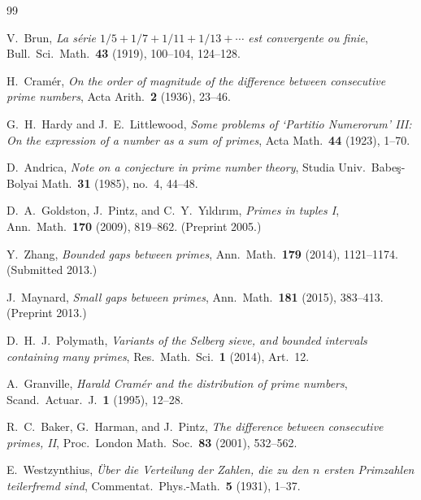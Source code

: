 \documentclass[12pt,a4paper]{amsart}
\theoremstyle{definition}
\begin{document}
\begin{thebibliography}{99}

V.\ Brun,
\textit{La s\'{e}rie $1/5 + 1/7 + 1/11 + 1/13 + \cdots$ est convergente ou finie},
Bull.\ Sci.\ Math.\ \textbf{43} (1919), 100--104, 124--128.

H.\ Cram\'{e}r,
\textit{On the order of magnitude of the difference between consecutive prime
numbers},
Acta Arith.\ \textbf{2} (1936), 23--46.

G.\ H.\ Hardy and J.\ E.\ Littlewood,
\textit{Some problems of `Partitio Numerorum' III: On the expression of a number
as a sum of primes},
Acta Math.\ \textbf{44} (1923), 1--70.

D.\ Andrica,
\textit{Note on a conjecture in prime number theory},
Studia Univ.\ Babe\c{s}-Bolyai Math.\ \textbf{31} (1985), no.\ 4, 44--48.

D.\ A.\ Goldston, J.\ Pintz, and C.\ Y.\ Y{\i}ld{\i}r{\i}m,
\textit{Primes in tuples I},
Ann.\ Math.\ \textbf{170} (2009), 819--862. (Preprint 2005.)

Y.\ Zhang,
\textit{Bounded gaps between primes},
Ann.\ Math.\ \textbf{179} (2014), 1121--1174. (Submitted 2013.)

J.\ Maynard,
\textit{Small gaps between primes},
Ann.\ Math.\ \textbf{181} (2015), 383--413. (Preprint 2013.)

D.\ H.\ J.\ Polymath,
\textit{Variants of the Selberg sieve, and bounded intervals containing many
primes},
Res.\ Math.\ Sci.\ \textbf{1} (2014), Art.\ 12.

A.\ Granville,
\textit{Harald Cram\'{e}r and the distribution of prime numbers},
Scand.\ Actuar.\ J.\ \textbf{1} (1995), 12--28.

R.\ C.\ Baker, G.\ Harman, and J.\ Pintz,
\textit{The difference between consecutive primes, II},
Proc.\ London Math.\ Soc.\ \textbf{83} (2001), 532--562.

E.\ Westzynthius,
\textit{\"{U}ber die Verteilung der Zahlen, die zu den $n$ ersten Primzahlen
teilerfremd sind},
Commentat.\ Phys.-Math.\ \textbf{5} (1931), 1--37.

\end{thebibliography}
\end{document}
